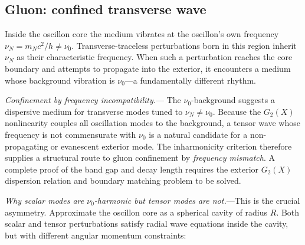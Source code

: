 \documentclass[11pt]{article}
\begin{document}
\subsection{Gluon: confined transverse wave}
\label{sec:gluon}

Inside the oscillon core the medium vibrates at
the oscillon's own frequency
$\nu_N = m_N c^2/h \neq \nu_0$.
Transverse-traceless perturbations born in
this region inherit $\nu_N$ as their
characteristic frequency.  When such a
perturbation reaches the core boundary and
attempts to propagate into the exterior, it
encounters a medium whose background vibration
is $\nu_0$---a fundamentally different rhythm.

\textit{Confinement by frequency incompatibility.}---
The $\nu_0$-background suggests a dispersive
medium for transverse modes tuned to
$\nu_N \neq \nu_0$.  Because the $G_2(X)$
nonlinearity couples all oscillation modes to
the background, a tensor wave whose frequency is
not commensurate with $\nu_0$ is a natural
candidate for a non-propagating or evanescent
exterior mode.  The inharmonicity criterion
therefore supplies a structural route to gluon
confinement by \emph{frequency mismatch}.  A
complete proof of the band gap and decay length
requires the exterior $G_2(X)$ dispersion relation
and boundary matching problem to be solved.

\textit{Why scalar modes are $\nu_0$-harmonic
but tensor modes are not.}---This is the crucial
asymmetry.  Approximate the oscillon core as a
spherical cavity of radius $R$.  Both scalar and
tensor perturbations satisfy radial wave equations
inside the cavity, but with different angular
momentum constraints:
\end{document}
